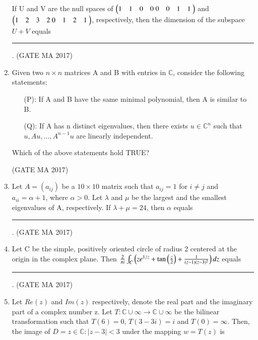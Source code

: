 \documentclass[journal,12pt,onecolumn]{IEEEtran}
\theoremstyle{remark}
\begin{document}
\begin{enumerate}
If U and V are the null spaces of $\begin{pmatrix}1 & 1 & 0 & 0 \ 0 & 0 & 1 & 1 \ \end{pmatrix}$ and $\begin{pmatrix} 1 & 2 & 3 & 2 \ 0 & 1 & 2 & 1 \ \end{pmatrix}$, respectively, then the dimension of the subspace $U+V$ equals \rule{1.5cm}{0.4pt}.
\hfill (GATE MA 2017)
\item
Given two $n \times n$ matrices A and B with entries in $\mathbb{C}$, consider the following statements:
\begin{itemize}
\item[(P):] If A and B have the same minimal polynomial, then A is similar to B.
\item[(Q):] If A has n distinct eigenvalues, then there exists $u \in \mathbb{C}^n$ such that $u, Au, \dots, A^{n-1}u$ are linearly independent.
\end{itemize}
Which of the above statements hold TRUE?
\begin{enumerate}
\end{enumerate}
\hfill (GATE MA 2017)
\item
Let $A=(a_{ij})$ be a $10 \times 10$ matrix such that $a_{ij}=1$ for $i \ne j$ and $a_{ii}=\alpha+1$, where $\alpha > 0$. Let $\lambda$ and $\mu$ be the largest and the smallest eigenvalues of A, respectively. If $\lambda + \mu = 24$, then $\alpha$ equals\\ \rule{1.5cm}{0.4pt}.
\hfill (GATE MA 2017)
\item
Let C be the simple, positively oriented circle of radius 2 centered at the origin in the complex plane. Then $\frac{2}{\pi i} \int_C \left( ze^{1/z} + \tan\left(\frac{z}{2}\right) + \frac{1}{(z-1)(z-3)^2} \right) dz$ equals \rule{1.5cm}{0.4pt}.
\hfill (GATE MA 2017)
\item
Let $Re(z)$ and $Im(z)$ respectively, denote the real part and the imaginary part of a complex number z. Let $T: \mathbb{C} \cup {\infty} \to \mathbb{C} \cup {\infty}$ be the bilinear transformation such that $T(6)=0$, $T(3-3i)=i$ and $T(0)=\infty$. Then, the image of $D = {z \in \mathbb{C} : |z-3|<3}$ under the mapping $w=T(z)$ is
\begin{enumerate}
\end{enumerate}
\end{enumerate}
\end{document}

